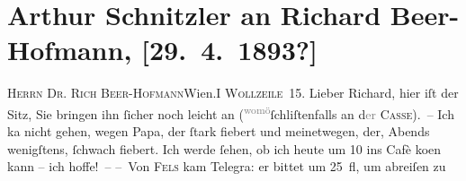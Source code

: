 

         
         \renewcommand{\erwaehntePersonen}{Personen: Ludwig Anzengruber, Richard Beer-Hofmann, Friedrich Michael Fels, Robert Fischer, Hugo von Hofmannsthal, Johann Schnitzler, Richard Specht}
         \renewcommand{\erwaehnteOrte}{Orte: Carl-Theater, Wien, Wollzeile}
         \renewcommand{\erwaehnteWerke}{Werke: Der ledige Hof. Schauspiel in 4 Akten, Tagebuch}
               \section[Arthur Schnitzler an Richard Beer-Hofmann, {[}29. 4. 1893?{]}]{ Arthur Schnitzler an Richard Beer-Hofmann, {[}29. 4. 1893?{]}}\nopagebreak{}\rehead{ }\begin{ledgroupsized}[t]{13cm}\normalsize\beginnumbering{} \toendnotes[C]{\smallbreak\pagebreak[2]} 
\toendnotes[C]{\smallbreak}\pstart{}{\pb}\textsc{Herrn Dr. Rich Beer-Hofmann}\pend{}\pstart{}Wien.\pend{}\pstart{}\textsc{I Wollzeile 15}.\pend{}{\bigskip}\pstart
           \noindent{}{\pb}Lieber Richard, hier iſt der Sitz, Sie
               bringen ihn ſicher noch leicht an \introOben{}(\substVorne{}\textsuperscript{\textcolor{gray}{womö}}\substDazwischen{}ſchli{\geminationm}\substHinten{}ſtenfalls an d\textcolor{gray}{er}{ }\textsc{Casse})\introOben{}. – Ich ka{\geminationn}
               nicht gehen, wegen Papa, der
               ſtark fiebert und meinetwegen, der, Abends wenigſtens, ſchwach fiebert. Ich werde
               ſehen, ob ich heute um 10 ins Cafè {\pb}ko{\geminationm}en kann – ich hoffe! –\pend
           \pstart
           – Von \textsc{Fels} kam Telegra{\geminationm}: er bittet um 25 fl, um abreiſen zu

\end{ledgroupsized}
